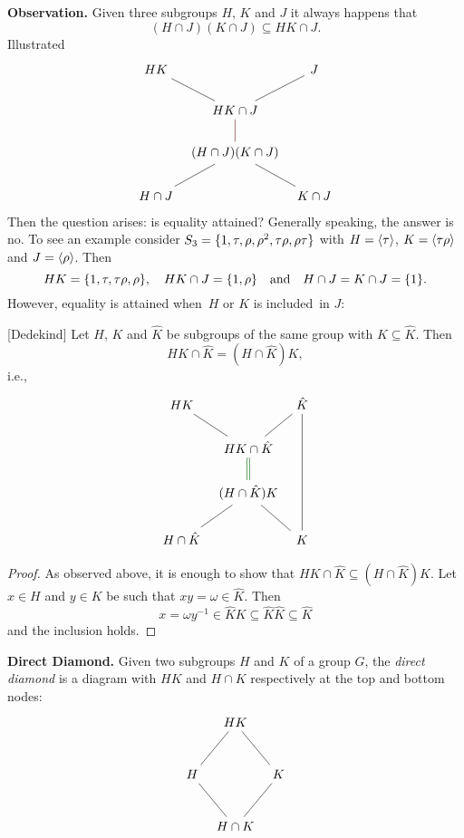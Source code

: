 \medskip


\textbf{Observation.} Given three subgroups $H$, $K$ and $J$ it always happens that
$$
    (H\cap J)(K\cap J)\subseteq HK\cap J.
$$
Illustrated
$$
    \begin{tikzcd}[column sep=tiny]
        HK\arrow[rd, no head]&&J\arrow[ld, no head]\\
        & HK\cap J\\
        & (H\cap J)(K\cap J)\arrow[u, no head, black!60!red]\\
        H\cap J\arrow[ru, no head]&& K\cap J \arrow[lu, no head]
    \end{tikzcd}
$$
Then the question arises: is equality attained? Generally speaking, the answer is no. To see an example consider $S_3=\{1, \tau, \rho, \rho^2, \tau\rho,\rho\tau\}$ with $H=\langle\tau\rangle$, $K=\langle\tau\rho\rangle$ and $J=\langle\rho\rangle$. Then
$$
    HK = \{1,\tau,\tau\rho,\rho\},\quad HK\cap J=\{1,\rho\}
        \quad\textrm{and}\quad H\cap J=K\cap J=\{1\}.
$$
However, equality is attained when~$H$ or $K$ is included~in $J$:

\begin{prop}{\rm[Dedekind]}\label{dedekind}
    Let $H$, $K$ and $\hat K$ be subgroups of the same group with $K\subseteq \hat K$. Then
    $$
        HK\cap \hat K= (H\cap \hat K)K,
    $$
    i.e.,
    $$
        \begin{tikzcd}[column sep=tiny]
            HK\arrow[rd, no head]&&\hat K\arrow[ld, no head]\\
            & HK\cap \hat K\\
            & (H\cap \hat K)K\arrow[u, no head, equal, black!60!green]\\
            H\cap \hat K\arrow[ru, no head] && K \arrow[lu, no head]\arrow[uuu, no head]
        \end{tikzcd}
    $$
\end{prop}

\begin{proof} As observed above, it is enough to show that $HK\cap \hat K\subseteq (H\cap \hat K)K$. Let $x\in H$ and $y\in K$ be such that $xy=\omega\in \hat K$. Then
$$
    x=\omega y^{-1}\in \hat KK\subseteq \hat K\hat K\subseteq \hat K
$$
and the inclusion holds. \end{proof}

\medskip

\textbf{Direct Diamond.} Given two subgroups $H$ and $K$ of a group $G$, the \textsl{direct diamond} is a diagram with $HK$ and $H\cap K$ respectively at the top and bottom nodes:
$$
\begin{tikzcd}[column sep=tiny, row sep=large]
    &HK \arrow[ld, no head] \arrow[rd, no head]\\
    H\arrow[rd, no head]&&K \arrow[ld, no head]\\
    &H\cap K                 
\end{tikzcd}
$$

